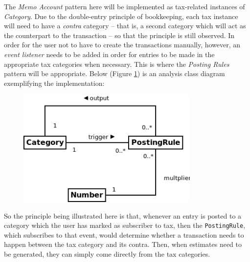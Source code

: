 The \emph{Memo Account} pattern here will be implemented as tax-related
instances of \emph{Category}. Due to the double-entry principle of bookkeeping,
each tax instance will need to have a \emph{contra} category -- that is, a
second category which will act as the counterpart to the transaction -- so that
the principle is still observed.  In order for the user not to have to create
the transactions manually, however, an \emph{event listener} needs to be added
in order for entries to be made in the appropriate tax categories when
necessary. This is where the \emph{Posting Rules} pattern will be appropriate.
Below (Figure \ref{fig:ClassDiagram.Memo_Categories_and_Posting_Rule}) is an
analysis class diagram exemplifying the implementation:
\begin{figure}[ht!]
  \begin{center}
    \includegraphics[width=9cm]{./contents/img/Class_Diagram_-_Memo_Categories_and_Posting_Rule.png}
  \end{center}
  \caption{}
  \label{fig:ClassDiagram.Memo_Categories_and_Posting_Rule}
\end{figure}
\FloatBarrier

So the principle being illustrated here is that, whenever an entry is posted to
a category which the user has marked as subscriber to tax, then the
\texttt{PostingRule}, which subscribes to that event, would determine whether a
transaction needs to happen between the tax category and its contra. Then, when
estimates need to be generated, they can simply come directly from the tax
categories.


